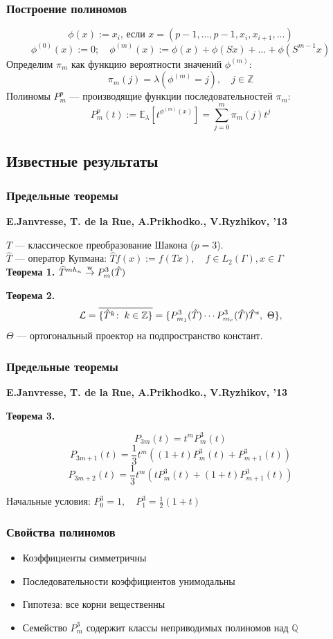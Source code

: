 \begin{frame}
    \frametitle{Построение полиномов}  
    \[\phi(x):=x_i\text{, если }x=(p-1, \ldots, p-1, x_i, x_{i+1}, \ldots)\]
    \[\phi^{(0)}(x):=0;\quad \phi^{(m)}(x):=\phi(x)+\phi(Sx)+\ldots+\phi(S^{m-1}x)\]
    Определим $\pi_m$ как функцию вероятности значений $\phi^{(m)}$:
    \[\pi_m(j) = \lambda(\phi^{(m)}=j), \quad j \in \mathbb{Z}\]
    Полиномы $P_m^p$ --- производящие функции последовательностей $\pi_m$:
    \[P_m^p(t):= \mathbb{E}_\lambda\left[ t^{\phi^{(m)}(x)}\right] = \sum\limits_{j=0}^m \pi_m(j) t^j \]
\end{frame}


\subsection{Известные результаты}


\begin{frame}
  \frametitle{Предельные теоремы}
  \textbf{E.Janvresse, T. de la Rue, A.Prikhodko., V.Ryzhikov, '13}
  
  \bigskip
  $T$ --- классическое преобразование Шакона ($p=3$).\\
  $\hat{T}$ --- оператор Купмана: $\hat{T}f(x) := f(Tx),\quad f \in L_2(\Gamma), x \in \Gamma$\\
  \bigskip
  {\bf Теорема 1.} $\widehat T^{mh_n} \mathrel{\stackrel{\mathrm w}{\to}} P_m^3(\hat{T})$
  
  {\bf Теорема 2.}
  $$
    \mathcal{L} = \overline{\{\hat{T}^k \where k \in \Set{Z}\}} = \{P_{m_1}^3(\hat{T})\cdots P_{m_r}^3(\hat{T})\hat{T}^s,\ \Theta\},
  $$
  $\Theta$ --- ортогональный проектор на подпространство констант. \\

\end{frame}


\begin{frame}
  \frametitle{Предельные теоремы}
  \textbf{E.Janvresse, T. de la Rue, A.Prikhodko., V.Ryzhikov, '13}\\ \bigskip

  {\bf Теорема 3.}

    \[P_{3m}(t)=t^m P_m^3(t)\]
    \[P_{3m+1}(t)=\frac{1}{3} t^m \left((1+t)P_m^3(t) + P_{m+1}^3(t) \right)\]
    \[P_{3m+2}(t)=\frac{1}{3} t^m \left(tP_m^3(t) + (1+t)P_{m+1}^3(t) \right)\]
    
   Начальные условия: $P_0^3 = 1,\quad P_1^3 = \frac{1}{2}(1+t)$
\end{frame}


\begin{frame}
  \frametitle{Свойства полиномов}
  \begin{itemize}
   \item Коэффициенты симметричны
   \item Последовательности коэффициентов унимодальны
   \item Гипотеза: все корни вещественны
   \item Семейство $P_m^3$ содержит классы неприводимых полиномов над $\mathbb{Q}$
  \end{itemize}
 \end{frame}

